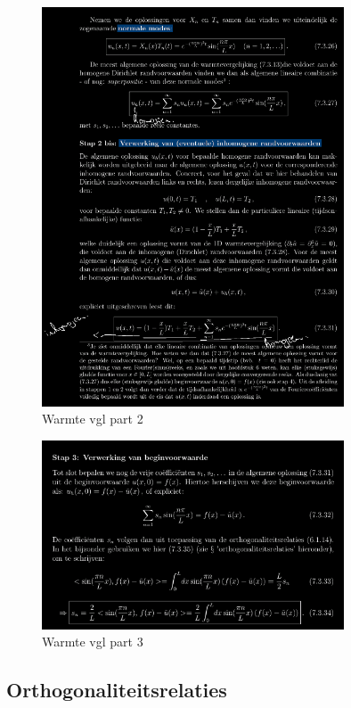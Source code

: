 \documentclass[a4paper]{report}
\begin{document}
\begin{figure}[H]
	\centering
	\includegraphics[width=0.8\textwidth]{assets/warmte_vgl_part_2.png}
	\caption{Warmte vgl part 2}
	\label{fig:warmte_vgl_part_2}
\end{figure}

\begin{figure}[H]
	\centering
	\includegraphics[width=0.8\textwidth]{assets/warmte_vgl_part_3.png}
	\caption{Warmte vgl part 3}
	\label{fig:warmte_vgl_part_3}
\end{figure}



\subsection{Orthogonaliteitsrelaties}
\end{document}
